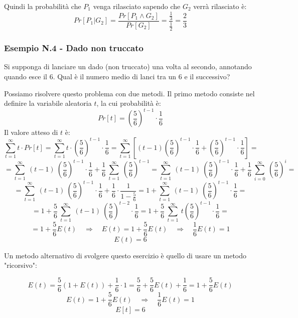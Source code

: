 Quindi la probabilità che $P_1$ venga rilasciato sapendo che $G_2$ verrà rilasciato è:
$$
Pr[P_1|G_2] = \frac{Pr[P_1 \wedge G_2]}{Pr[G_2]} = \frac{\frac{1}{3}}{\frac{1}{2}} = \frac{2}{3}
$$

\subsubsection{Esempio N.4 - Dado non truccato}
Si supponga di lanciare un dado (non truccato) una volta al secondo, annotando quando esce il 6. Qual è il numero medio di lanci tra un 6 e il successivo? 

Possiamo risolvere questo problema con due metodi. Il primo metodo consiste nel definire la variabile aleatoria $t$, la cui probabilità è:
$$
Pr[t] = (\frac{5}{6})^{t-1}	\cdot \frac{1}{6}
$$
Il valore atteso di $t$ è:
$$
\sum_{t=1}^{\infty}t \cdot Pr[t] = \sum_{t=1}^{\infty}t \cdot (\frac{5}{6})^{t-1}	\cdot \frac{1}{6} = \sum_{t=1}^{\infty}[(t-1) (\frac{5}{6})^{t-1} \cdot \frac{1}{6} + (\frac{5}{6})^{t-1}	\cdot \frac{1}{6}] =
$$
$$
= \sum_{t=1}^{\infty}\ (t-1)\ (\frac{5}{6})^{t-1} \cdot \frac{1}{6} + \frac{1}{6}\  \sum_{t=1}^{\infty}\ (\frac{5}{6})^{t-1} = \sum_{t=1}^{\infty}\ (t-1)\ (\frac{5}{6})^{t-1} \cdot \frac{1}{6} + \frac{1}{6}\  \sum_{i=0}^{\infty}\ (\frac{5}{6})^i =
$$
$$
= \sum_{t=1}^{\infty}\ (t-1)\ (\frac{5}{6})^{t-1} \cdot \frac{1}{6} + \frac{1}{6} \cdot \frac{1}{1 - \frac{5}{6}} =
1 + \sum_{t=1}^{\infty}\ (t-1)\ (\frac{5}{6})^{t-1} \cdot \frac{1}{6} = 
$$
$$
= 1 + \frac{5}{6}\ \sum_{t=1}^{\infty}\ (t-1)\ (\frac{5}{6})^{t-2} \cdot \frac{1}{6} = 1 + \frac{5}{6}\  \sum_{t=1}^{\infty}\ t(\frac{5}{6})^{t-1} \cdot \frac{1}{6} =
$$
$$
= 1 + \frac{5}{6} E(t) \quad \Rightarrow \quad E(t) = 1 + \frac{5}{6} E(t)\quad \Rightarrow \quad \frac{1}{6} E(t) = 1
$$
$$
E(t) = 6
$$


Un metodo alternativo di svolgere questo esercizio è quello di usare un metodo "ricorsivo":

$$
E(t) = \frac{5}{6}(1 + E(t)) + \frac{1}{6} \cdot 1 = \frac{5}{6} + \frac{5}{6} E(t) + \frac{1}{6} = 1 + \frac{5}{6} E(t)
$$
$$
E(t) = 1 + \frac{5}{6} E(t)\quad \Rightarrow \quad \frac{1}{6} E(t) = 1 
$$
$$
E[t] = 6
$$
